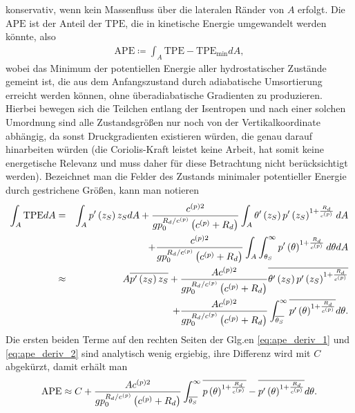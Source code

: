 \documentclass{book}
\newcommand\newoverline[1]{%
\overline{#1}}
\newcommand{\TPE}{\text{TPE}}
\newcommand{\APE}{\text{APE}}
\begin{document}
%
konservativ, wenn kein Massenfluss über die lateralen Ränder von $A$ erfolgt. Die $\APE$ ist der Anteil der $\TPE$, die in kinetische Energie umgewandelt werden könnte, also
%
\begin{eqnarray}
\APE \coloneqq \int_A\TPE - \TPE_{\text{min}}dA, 
\end{eqnarray}
%
wobei das Minimum der potentiellen Energie aller hydrostatischer Zustände gemeint ist, die aus dem Anfangszustand durch adiabatische Umsortierung erreicht werden können, ohne überadiabatische Gradienten zu produzieren. Hierbei bewegen sich die Teilchen entlang der Isentropen und nach einer solchen Umordnung sind alle Zustandsgrößen nur noch von der Vertikalkoordinate abhängig, da sonst Druckgradienten existieren würden, die genau darauf hinarbeiten würden (die Coriolis-Kraft leistet keine Arbeit, hat somit keine energetische Relevanz und muss daher für diese Betrachtung nicht berücksichtigt werden). Bezeichnet man die Felder des Zustands minimaler potentieller Energie durch gestrichene Größen, kann man notieren
%
\begin{eqnarray}
\int_A\TPE dA & = & \int_Ap'\left(z_S\right)z_SdA + \frac{c^{(p)2}}{gp_0^{R_d/c^{(p)}}\left(c^{(p)} + R_d\right)}\int_A\theta'\left(z_S\right)p'\left(z_S\right)^{1 + \frac{R_d}{c^{(p)}}}dA \nonumber\\
&&+\frac{c^{(p)2}}{gp_0^{R_d/c^{(p)}}\left(c^{(p)} + R_d\right)}\int_A\int_{\theta_S}^\infty p'\left(\theta\right)^{1 + \frac{R_d}{c^{(p)}}}d\theta dA\nonumber\\
& \approx & A\newoverline{p'\left(z_S\right)z_S} + \frac{Ac^{(p)2}}{gp_0^{R_d/c^{(p)}}\left(c^{(p)} + R_d\right)}\newoverline{\theta'\left(z_S\right)p'\left(z_S\right)^{1 + \frac{R_d}{c^{(p)}}}} \nonumber\\
&&+ \frac{Ac^{(p)2}}{gp_0^{R_d/c^{(p)}}\left(c^{(p)} + R_d\right)}\int_{\newoverline{\theta_S}}^\infty\newoverline{p'\left(\theta\right)^{1 + \frac{R_d}{c^{(p)}}}}d\theta.\label{eq:ape_deriv_2}
\end{eqnarray}
%
Die ersten beiden Terme auf den rechten Seiten der Glg.en \eqref{eq:ape_deriv_1} und \eqref{eq:ape_deriv_2} sind analytisch wenig ergiebig, ihre Differenz wird mit $C$ abgekürzt, damit erhält man
%
\begin{eqnarray}
\APE \approx C + \frac{Ac^{(p)2}}{gp_0^{R_d/c^{(p)}}\left(c^{(p)} + R_d\right)}\int_{\newoverline{\theta_S}}^\infty\newoverline{p\left(\theta\right)^{1 + \frac{R_d}{c^{(p)}}}} - \newoverline{p'\left(\theta\right)^{1 + \frac{R_d}{c^{(p)}}}}d\theta.
\end{eqnarray}
\end{document}
